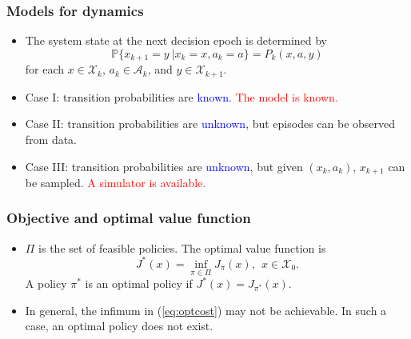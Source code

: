 \documentclass{beamer}
\newcommand{\Prob}{\mathbb{P}}
\def\X{{\mathcal X}}
\newcommand{\blue}[1]{\textcolor{blue}{#1}}
\newcommand{\red}[1]{\textcolor{red}{#1}}
\begin{document}
\begin{frame}
  \frametitle{Models for dynamics}
  \begin{itemize}
  \item The system state at the next decision epoch is
    determined by
    $$\Prob\Big\{x_{k+1} = y~\Big| x_k = x, a_k=a\Big\} = P_k(x, a,y)$$
    for each $x\in \mathcal{X}_k$, $a_k\in \mathcal{A}_k$, and $y\in \mathcal{X}_{k+1}$.
  \item Case I: transition probabilities are \blue{known.} \red{The  model is known.}

  \item Case II: transition probabilities are \blue{unknown}, but episodes can be observed from data.

  \item Case III: transition probabilities are \blue{unknown}, but
        given $(x_k, a_k)$, $x_{k+1}$ can be sampled. \red{A simulator is  available.}

  \end{itemize}
\end{frame}


\begin{frame}
  \frametitle{Objective and optimal value function}
  \begin{itemize}
 \item  $\Pi$ is the set of feasible policies. The optimal value function is
  \begin{equation}\label{eq:optcost}
  J^*(x) = \inf\limits_{\pi\in \Pi} J_\pi(x), ~~x\in \X_0.
  \end{equation}
A policy $\pi^*$ is an optimal policy if  $J^*(x) = J_{\pi^*}(x)$.

\item In general, the infimum in (\ref{eq:optcost}) may not be achievable. In such a case, an optimal policy does not exist.

  \end{itemize}

\end{frame}
\end{document}
